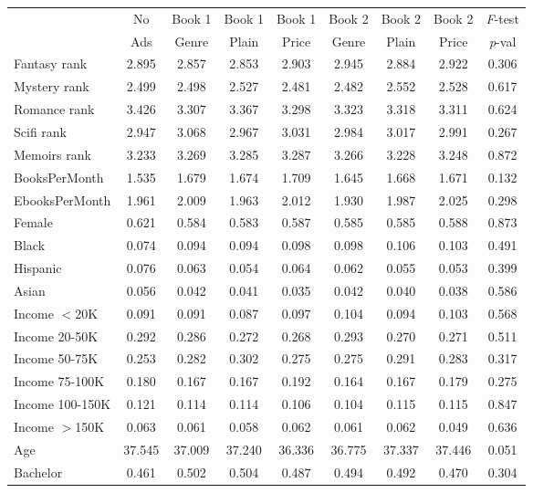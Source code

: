 \begin{center}
\begin{tabular}{lcccccccc}
\hline \noalign{\smallskip} & No & Book 1 & Book 1 & Book 1 & Book 2 & Book 2 & Book 2 & \emph{F}-test\\
 & Ads & Genre & Plain & Price & Genre & Plain & Price & \emph{p}-val\\
\noalign{\smallskip}\hline \noalign{\smallskip}Fantasy rank & 2.895 & 2.857 & 2.853 & 2.903 & 2.945 & 2.884 & 2.922 & 0.306\\
Mystery rank & 2.499 & 2.498 & 2.527 & 2.481 & 2.482 & 2.552 & 2.528 & 0.617\\
Romance rank & 3.426 & 3.307 & 3.367 & 3.298 & 3.323 & 3.318 & 3.311 & 0.624\\
Scifi rank & 2.947 & 3.068 & 2.967 & 3.031 & 2.984 & 3.017 & 2.991 & 0.267\\
Memoirs rank & 3.233 & 3.269 & 3.285 & 3.287 & 3.266 & 3.228 & 3.248 & 0.872\\
BooksPerMonth & 1.535 & 1.679 & 1.674 & 1.709 & 1.645 & 1.668 & 1.671 & 0.132\\
EbooksPerMonth & 1.961 & 2.009 & 1.963 & 2.012 & 1.930 & 1.987 & 2.025 & 0.298\\
Female & 0.621 & 0.584 & 0.583 & 0.587 & 0.585 & 0.585 & 0.588 & 0.873\\
Black & 0.074 & 0.094 & 0.094 & 0.098 & 0.098 & 0.106 & 0.103 & 0.491\\
Hispanic & 0.076 & 0.063 & 0.054 & 0.064 & 0.062 & 0.055 & 0.053 & 0.399\\
Asian & 0.056 & 0.042 & 0.041 & 0.035 & 0.042 & 0.040 & 0.038 & 0.586\\
Income $<$20K & 0.091 & 0.091 & 0.087 & 0.097 & 0.104 & 0.094 & 0.103 & 0.568\\
Income 20-50K & 0.292 & 0.286 & 0.272 & 0.268 & 0.293 & 0.270 & 0.271 & 0.511\\
Income 50-75K & 0.253 & 0.282 & 0.302 & 0.275 & 0.275 & 0.291 & 0.283 & 0.317\\
Income 75-100K & 0.180 & 0.167 & 0.167 & 0.192 & 0.164 & 0.167 & 0.179 & 0.275\\
Income 100-150K & 0.121 & 0.114 & 0.114 & 0.106 & 0.104 & 0.115 & 0.115 & 0.847\\
Income $>$150K & 0.063 & 0.061 & 0.058 & 0.062 & 0.061 & 0.062 & 0.049 & 0.636\\
Age & 37.545 & 37.009 & 37.240 & 36.336 & 36.775 & 37.337 & 37.446 & 0.051\\
Bachelor & 0.461 & 0.502 & 0.504 & 0.487 & 0.494 & 0.492 & 0.470 & 0.304\\

\end{tabular}
\end{center}
